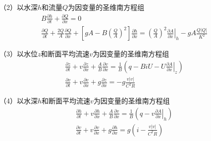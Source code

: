 （2）以水深$h$和流量$Q$为因变量的圣维南方程组
\begin{equation}
  \begin{gathered}
    B\frac{\partial h}{\partial t}
    +
    \frac{\partial Q}{\partial x}
    =
    0
    \\
    \frac{\partial Q}{\partial t}
    +
    \frac{2Q}{A}\frac{\partial Q}{\partial x}
    +
    \left[
      gA -
      B
      \left(
      \frac{Q}{A}
      \right)^{2}
    \right]
    \frac{\partial h}{\partial x}
    =
    \left(
    \frac{Q}{A}
    \right)^{2}
    \left.
    \frac{\partial A}{\partial x}
    \right|_{h}
    -
    gA\frac{Q|Q|}{K^{2}}
  \end{gathered}
  \label{EqCGe_SV_hQ}
\end{equation}



（3）以水位$z$和断面平均流速$v$为因变量的圣维南方程组
\begin{equation}
  \begin{gathered}
    \frac{\partial z}{\partial t}
    +
    v\frac{\partial z}{\partial x}
    +
    \frac{A}{B}\frac{\partial v}{\partial x}
    =
    \frac{1}{B}
    \left(
    q - BiU - U\left.\frac{\partial A}{\partial x}\right|_{z}
    \right)
    \\
    \frac{\partial v}{\partial t}
    +
    v\frac{\partial v}{\partial x}
    +
    g\frac{\partial z}{\partial x}
    =
    -g\frac{v|v|}{C^{2}R}
  \end{gathered}
  \label{EqCGe_SV_zU}
\end{equation}

（4）以水深$h$和断面平均流速$v$为因变量的圣维南方程组
\begin{equation}
  \begin{gathered}
    \frac{\partial h}{\partial t}
    +
    v\frac{\partial h}{\partial x}
    +
    \frac{A}{B}\frac{\partial v}{\partial x}
    =
    \frac{1}{B}
    \left(
    q - v\left.\frac{\partial A}{\partial x}\right|_{h}
    \right)
    \\
    \frac{\partial v}{\partial t}
    +
    v\frac{\partial v}{\partial x}
    +
    g\frac{\partial h}{\partial x}
    =
    g
    \left(
    i-\frac{v|v|}{C^{2}R}
    \right)
  \end{gathered}
  \label{EqCGe_SV_hU}
\end{equation}

